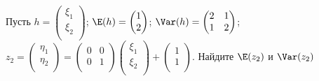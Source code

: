 \documentclass[pdftex,11pt,openany]{book}\usepackage[]{graphicx}\usepackage[]{color}
\begin{document}
\begin{problem}
Пусть $h =  \begin{pmatrix}
\xi_1 \\
\xi_2 \\
\end{pmatrix} $; $\E (h) =  \begin{pmatrix}
1\\
2\\
\end{pmatrix} $; $\Var (h) =  \begin{pmatrix}
2 & 1 \\
1 & 2 \\
\end{pmatrix} $; $z_2 =  \begin{pmatrix}
\eta_1 \\
\eta_2 \\
\end{pmatrix}  =  \begin{pmatrix}
0 & 0 \\
0 & 1 \\
\end{pmatrix}   \begin{pmatrix}
\xi_1 \\
\xi_2 \\
\end{pmatrix}  +  \begin{pmatrix}
1\\
1\\
\end{pmatrix} $. Найдите $\E (z_2)$ и $\Var (z_2)$
\end{problem}
\end{document}
